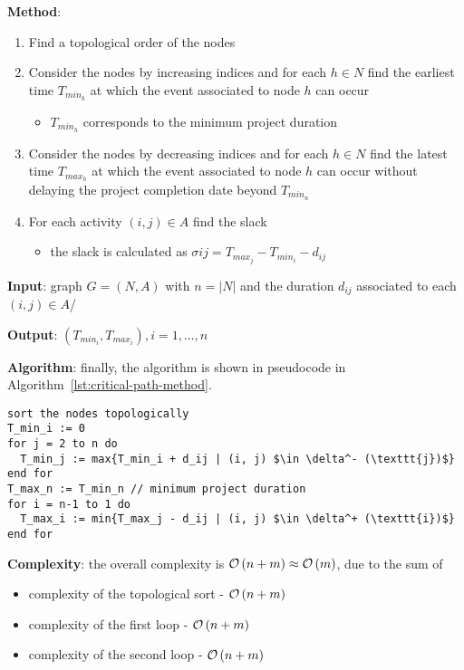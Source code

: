 \documentclass[english]{article}
\begin{document}
\bigskip
\textbf{Method}:

\begin{enumerate}
  \item Find a topological order of the nodes
  \item Consider the nodes by increasing indices and for each \(h \in N\) find the earliest time \(T_{min_h}\) at which the event associated to node \(h\) can occur
        \begin{itemize}[label = \(\rightarrow\)]
          \item \(T_{min_h}\) corresponds to the minimum project duration
        \end{itemize}
  \item Consider the nodes by decreasing indices and for each \(h \in N\) find the latest time \(T_{max_h}\) at which the event associated to node \(h\) can occur without delaying the project completion date beyond \(T_{min_n}\)
  \item For each activity \(\left( i, j \right) \in A\) find the slack
        \begin{itemize}[label = \(\rightarrow\)]
          \item the slack is calculated as \(\sigma{ij} = T_{max_j} - T_{min_i} - d_{ij}\)
        \end{itemize}
\end{enumerate}

\bigskip
\textbf{Input}:
graph \(G = (N, A)\) with \(n = |N|\) and the duration \(d_{ij}\) associated to each \(\left( i, j \right) \in A\)/

\textbf{Output}:
\(\left( T_{min_i}, T_{max_i} \right), i = 1, \ldots, n\)

\bigskip
\textbf{Algorithm}:
finally, the algorithm is shown in pseudocode in Algorithm~\ref{lst:critical-path-method}.

\begin{lstlisting}[style=custom, language=pseudocode, caption={Critical path method}, label={lst:critical-path-method}]
sort the nodes topologically
T_min_i := 0
for j = 2 to n do
  T_min_j := max{T_min_i + d_ij | (i, j) $\in \delta^- (\texttt{j})$}
end for
T_max_n := T_min_n // minimum project duration
for i = n-1 to 1 do
  T_max_i := min{T_max_j - d_ij | (i, j) $\in \delta^+ (\texttt{i})$}
end for
\end{lstlisting}

\bigskip
\textbf{Complexity}:
the overall complexity is \(\mathcal{O}\left(n+m\right) \approx \mathcal{O}\left(m\right)\), due to the sum of

\begin{itemize}
  \item complexity of the topological sort - \(\mathcal{O}\left(n+m\right)\)
  \item complexity of the first loop - \(\mathcal{O}\left(n+m\right)\)
  \item complexity of the second loop - \(\mathcal{O}\left(n+m\right)\)
\end{itemize}
\end{document}
